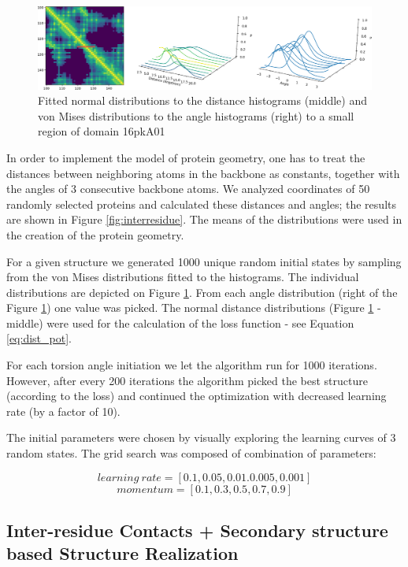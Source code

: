 \begin{figure}
    \centering
    \includegraphics[width=\linewidth]{imgs_tomas/norm_histograms.png}
    \caption{Fitted normal distributions to the distance histograms (middle) and von Mises distributions to the angle histograms (right) to a small region of domain 16pkA01}
    \label{fig:distributions}
\end{figure}

In order to implement the model of protein geometry, one has to treat the distances between neighboring atoms in the backbone as constants, together with the angles of 3 consecutive backbone atoms. We analyzed coordinates of 50 randomly selected proteins and calculated these distances and angles; the results are shown in Figure \ref{fig:interresidue}. The means of the distributions were used in the creation of the protein geometry.

For a given structure we generated 1000 unique random initial states by sampling from the von Mises distributions fitted to the histograms. The individual distributions are depicted on Figure \ref{fig:distributions}. From each angle distribution (right of the Figure \ref{fig:distributions}) one value was picked. The normal distance distributions (Figure \ref{fig:distributions} - middle) were used for the calculation of the loss function - see Equation \ref{eq:dist_pot}.

For each torsion angle initiation we let the algorithm run for 1000 iterations. However, after every 200 iterations the algorithm picked the best structure (according to the loss) and continued the optimization with decreased learning rate (by a factor of 10).

The initial parameters were chosen by visually exploring the learning curves of 3 random states. The grid search was composed of combination of parameters:

$$learning~rate = [0.1, 0.05, 0.01. 0.005, 0.001]$$
$$momentum = [0.1, 0.3, 0.5, 0.7, 0.9]$$


\subsection{Inter-residue Contacts + Secondary structure based Structure Realization}

